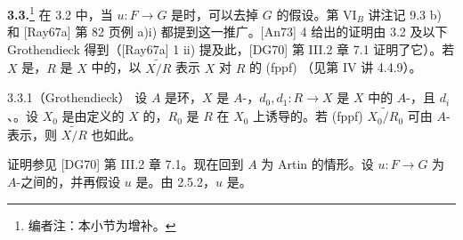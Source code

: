 \textbf{3.3.}\footnote{编者注：本小节为增补。} 在 3.2 中，当 $u:F\to G$ 是时，可以去掉 $G$ 的假设。第 VI$_B$ 讲注记 9.3 b) 和 [Ray67a] 第 82 页例 a)i) 都提到这一推广。[An73]  4 给出的证明由 3.2 及以下 Grothendieck 得到（[Ray67a]  1 ii) 提及此，[DG70] 第 III.2 章 7.1 证明了它）。若 $X$ 是，$R$ 是 $X$ 中的，以 $\widetilde{X/R}$ 表示 $X$ 对 $R$ 的 (fppf) （见第 IV 讲 4.4.9）。
\begin{SGAresult}{}{3.3.1（Grothendieck）}
设 $A$ 是环，$X$ 是 $A$-，$d_0,d_1:R\to X$ 是 $X$ 中的 $A$-，且 $d_i$ 、。设 $X_0$ 是由定义的 $X$ 的，$R_0$ 是 $R$ 在 $X_0$ 上诱导的。若 (fppf)  $\widetilde{X_0/R_0}$ 可由 $A$-表示，则 $\widetilde{X/R}$ 也如此。
\end{SGAresult}
证明参见 [DG70] 第 III.2 章 7.1。现在回到 $A$ 为 Artin 的情形。设 $u:F\to G$ 为 $A$-之间的，并再假设 $u$ 是。由 2.5.2，$u$ 是。

